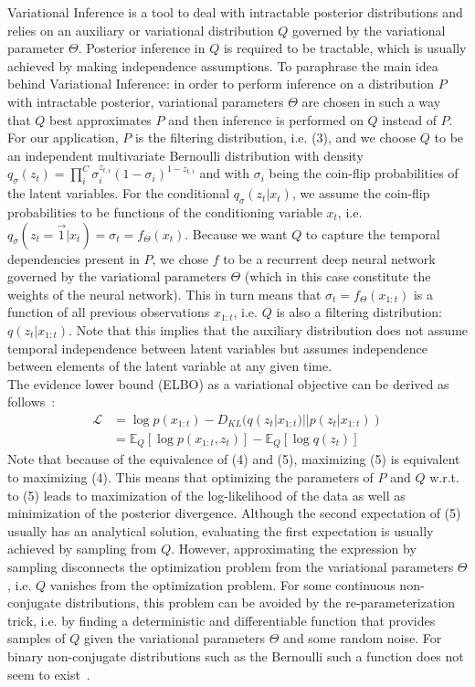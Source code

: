  Variational Inference is a tool to deal with intractable posterior distributions and relies on an auxiliary or variational distribution $Q$ governed by the variational parameter $\Theta$. Posterior inference in $Q$ is required to be tractable, which is usually achieved by making independence assumptions. To paraphrase the main idea behind Variational Inference: in order to perform inference on a distribution $P$ with intractable posterior, variational parameters $\Theta$ are chosen in such a way that $Q$ best approximates $P$ and then inference is performed on $Q$ instead of $P$. For our application, $P$ is the filtering distribution, i.e. (3), and we choose $Q$ to be an independent multivariate Bernoulli distribution with density $q_\sigma(z_t) = \prod_i^C \sigma_i^{z_{t,i}}(1-\sigma_i)^{1-z_{t,i}}$ and with $\sigma_i$ being the coin-flip probabilities of the latent variables. For the conditional $q_\sigma(z_t|x_t)$, we assume the coin-flip probabilities to be functions of the conditioning variable $x_t$, i.e. $q_\sigma(z_{t} =\vec{1}|x_t) = \sigma_{t} = f_\Theta(x_t)$. Because we want $Q$ to capture the temporal dependencies present in $P$, we chose $f$ to be a recurrent deep neural network governed by the variational parameters $\Theta$ (which in this case constitute the weights of the neural network). This in turn means that $\sigma_t = f_\Theta(x_{1:t})$ is a function of all previous observations $x_{1:t}$, i.e. $Q$ is also a filtering distribution: $q(z_t|x_{1:t})$. Note that this implies that the auxiliary distribution does not assume temporal independence between latent variables but assumes independence between elements of the latent variable at any given time.\\
The evidence lower bound (ELBO) as a variational objective can be derived as follows~\cite{blei2011variational}:
\begin{align}
\mathcal{L} &= \log p(x_{1:t}) - D_{KL}(q(z_{t}|x_{1:t}) || p(z_{t}|x_{1:t}))\\
&=  \mathbb{E}_{Q}[\log p(x_{1:t},z_{t})] - \mathbb{E}_{Q}[\log q(z_{t})]
\end{align}
Note that because of the equivalence of (4) and (5), maximizing (5) is equivalent to maximizing (4). This means that optimizing the parameters of $P$ and $Q$ w.r.t. to (5) leads to maximization of the log-likelihood of the data as well as minimization of the posterior divergence. Although the second expectation of (5) usually has an analytical solution, evaluating the first expectation is usually achieved by sampling from $Q$. However, approximating the expression by sampling disconnects the optimization problem from the variational parameters $\Theta$, i.e. $Q$ vanishes from the optimization problem. For some continuous non-conjugate distributions, this problem can be avoided by the re-parameterization trick, i.e. by finding a deterministic and differentiable function that provides samples of $Q$ given the variational parameters $\Theta$ and some random noise. For binary non-conjugate distributions such as the Bernoulli such a function does not seem to exist~\cite{kingma2013auto}.\\
